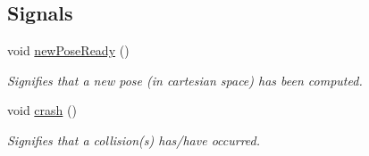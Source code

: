 \subsection*{Signals}
\begin{DoxyCompactItemize}
\item 
void \hyperlink{class_collision_detector_a9540d0ce34c4721abb8bf9bfcb1f67dd}{newPoseReady} ()
\begin{DoxyCompactList}\small\item\em Signifies that a new pose (in cartesian space) has been computed. \item\end{DoxyCompactList}\item 
void \hyperlink{class_collision_detector_a7a6c1a9b11907db7252b6544ee1ce8b4}{crash} ()
\begin{DoxyCompactList}\small\item\em Signifies that a collision(s) has/have occurred. \item\end{DoxyCompactList}\end{DoxyCompactItemize}
